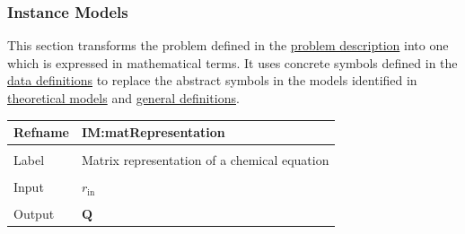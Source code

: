 \documentclass[12pt]{article}
\begin{document}
\subsubsection{Instance Models}
\label{Sec:IMs}
This section transforms the problem defined in the \hyperref[Sec:ProbDesc]{problem description} into one which is expressed in mathematical terms. It uses concrete symbols defined in the \hyperref[Sec:DDs]{data definitions} to replace the abstract symbols in the models identified in \hyperref[Sec:TMs]{theoretical models} and \hyperref[Sec:GDs]{general definitions}.

\vspace{\baselineskip}
\noindent
\begin{minipage}{\textwidth}
\begin{tabular}{>{\raggedright}p{}>{\raggedright\arraybackslash}p{}}
\toprule \textbf{Refname} & \textbf{IM:matRepresentation}
\label{IM:matRepresentation}
\\ \midrule \\
Label & Matrix representation of a chemical equation
        
\\ \midrule \\
Input & ${r_{\text{in}}}$
        
\\ \midrule \\
Output & $\symbf{Q}$
         

\end{tabular}
\end{minipage}
\end{document}
